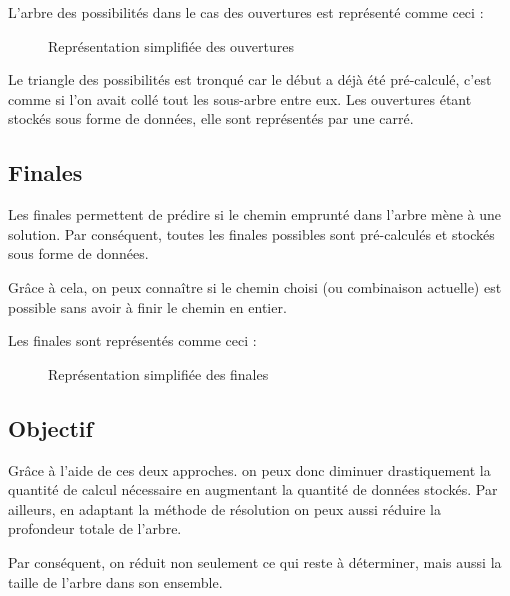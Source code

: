 	L'arbre des possibilités dans le cas des ouvertures est représenté comme ceci :
	
	\begin{figure}[H]
		\begin{center}
				
		\end{center}
		
		\caption{Représentation simplifiée des ouvertures}
		\label{fig:ouvertures}
	\end{figure}
		
	Le triangle des possibilités est tronqué car le début a déjà été pré-calculé, c'est comme si l'on avait collé tout les sous-arbre entre eux. Les ouvertures étant stockés sous forme de données, elle sont représentés par une carré.

	\subsection{Finales}

	Les finales permettent de prédire si le chemin emprunté dans l'arbre mène à une solution. Par conséquent, toutes les finales possibles sont pré-calculés et stockés sous forme de données.
	
	Grâce à cela, on peux connaître si le chemin choisi (ou combinaison actuelle) est possible sans avoir à finir le chemin en entier.
	
	Les finales sont représentés comme ceci :
	
	\begin{figure}[H]
		\begin{center}
				
		\end{center}
		
		\caption{Représentation simplifiée des finales}
		\label{fig:finales}
	\end{figure}
	
	\subsection{Objectif}
	
	Grâce à l'aide de ces deux approches. on peux donc diminuer drastiquement la quantité de calcul nécessaire en augmentant la quantité de données stockés. Par ailleurs, en adaptant la méthode de résolution on peux aussi réduire la profondeur totale de l'arbre.
	
	Par conséquent, on réduit non seulement ce qui reste à déterminer, mais aussi la taille de l'arbre dans son ensemble.
	

